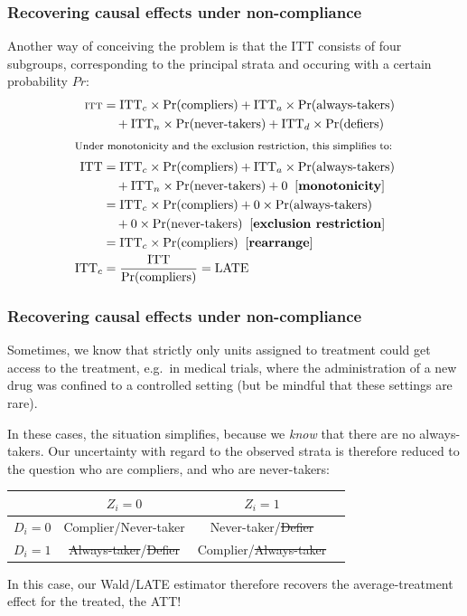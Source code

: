 \documentclass[12pt,english,dvipsnames,aspectratio=169,handout]{beamer}\usepackage[]{graphicx}\usepackage[]{xcolor}
\begin{document}
\begin{frame}
\frametitle{Recovering causal effects under non-compliance}
\footnotesize Another way of conceiving the problem is that the ITT consists of four subgroups, corresponding to the principal strata and occuring with a certain probability $Pr$:
\begin{align*} \scriptsize
\text{ITT} &= \text{ITT}_{c} \times \text{Pr(compliers)} + \text{ITT}_{a} \times \text{Pr(always-takers)} \\
 &~~~ +  \text{ITT}_{n} \times \text{Pr(never-takers)} + \text{ITT}_{d} \times \text{Pr(defiers)} \\
 \shortintertext{\footnotesize Under monotonicity and the exclusion restriction, this simplifies to:}
\text{ITT} &= \text{ITT}_{c} \times \text{Pr(compliers)} + \text{ITT}_{a} \times \text{Pr(always-takers)} \\
 &~~~ +  \text{ITT}_{n} \times \text{Pr(never-takers)} + 0 \;\;[\text{\textbf{monotonicity}}] \\ 
 &= \text{ITT}_{c} \times \text{Pr(compliers)} +0 \times \text{Pr(always-takers)} \\
 &~~~ + 0 \times \text{Pr(never-takers)}\;\;[\text{\textbf{exclusion restriction}}] \\ 
 &= \text{ITT}_{c} \times \text{Pr(compliers)}\;\;[\text{\textbf{rearrange}}] \\ 
 \text{ITT}_{c} &=  \frac{\text{ITT}}{\text{Pr(compliers)}} = \text{LATE} \\
\end{align*}
\end{frame}


\begin{frame}
\frametitle{Recovering causal effects under non-compliance}
\footnotesize
Sometimes, we know that strictly only units assigned to treatment could get access to the treatment, e.g.\ in medical trials, where the administration of a new drug was confined to a controlled setting (but be mindful that these settings are rare).\\
\vspace{2mm}

In these cases, the situation simplifies, because we \emph{know} that there are no always-takers. Our uncertainty with regard to the observed strata is therefore reduced to the question who are compliers, and who are never-takers:

\begin{table}[htbp]\centering\footnotesize
\begin{tabular}{cccc}
\hline
        &         $Z_i=0$         & $Z_i=1$ \\ 
\hline
$D_i=0$ & Complier/Never-taker  & Never-taker/\sout{Defier} \\
$D_i=1$ & \sout{Always-taker}/\sout{Defier}   & Complier/\sout{Always-taker}  \\
\hline
\end{tabular}
\end{table}
In this case, our Wald/LATE estimator therefore recovers the average-treatment effect for the treated, the ATT! 
\end{frame}
\end{document}
